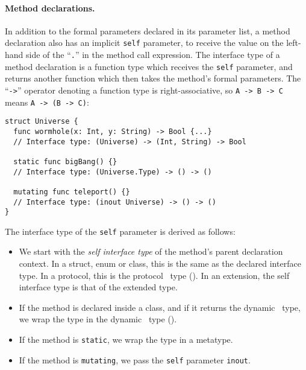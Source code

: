 \documentclass[../generics]{subfiles}
\begin{document}
\paragraph{Method declarations.}
In addition to the formal parameters declared in its parameter list, a method declaration also has an implicit \texttt{self} parameter, to receive the value on the left-hand side of the ``\texttt{.}'' in the method call expression. The interface type of a method declaration is a function type which receives the \texttt{self} parameter, and returns another function which then takes the method's formal parameters. The ``\texttt{->}'' operator denoting a function type is right-associative, so \verb|A -> B -> C| means \verb|A -> (B -> C)|:
\begin{Verbatim}
struct Universe {
  func wormhole(x: Int, y: String) -> Bool {...}
  // Interface type: (Universe) -> (Int, String) -> Bool

  static func bigBang() {}
  // Interface type: (Universe.Type) -> () -> ()

  mutating func teleport() {}
  // Interface type: (inout Universe) -> () -> ()
}
\end{Verbatim}
The interface type of the \texttt{self} parameter is derived as follows:
\begin{itemize}
\item We start with the \emph{self interface type} of the method's parent declaration context. In a struct, enum or class, this is the same as the declared interface type. In a protocol, this is the protocol \IndexSelf\tSelf\ type (). In an extension, the self interface type is that of the extended type.

\item If the method is declared inside a class, and if it returns the dynamic \tSelf\ type, we wrap the type in the dynamic \tSelf\ type ().

\item If the method is \texttt{static}, we wrap the type in a metatype.

\item If the method is \texttt{mutating}, we pass the \texttt{self} parameter \texttt{inout}.

\end{itemize}
\end{document}
